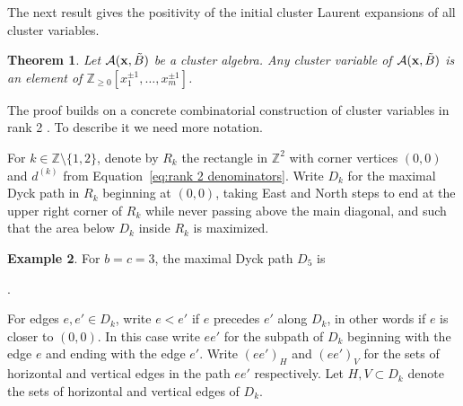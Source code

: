 \documentclass{amsart}
\newtheorem{theorem}{Theorem}[section]
\theoremstyle{definition}
\newtheorem{example}[theorem]{Example}
\theoremstyle{remark}
\numberwithin{equation}{section}
\newcommand{\cA}{{\mathcal{A}}}
\newcommand{\bx}{{\bf x}}
\newcommand{\ZZ}{{\mathbb{Z}}}
\begin{document}
  The next result gives the positivity of the initial cluster Laurent expansions of all cluster variables.
  \begin{theorem}\cite{LS13}
    Let $\cA(\bx,\tilde B)$ be a cluster algebra.  Any cluster variable of $\cA(\bx,\tilde B)$ is an element of $\ZZ_{\ge0}[x_1^{\pm1},\ldots,x_m^{\pm1}]$.
  \end{theorem}
  The proof builds on a concrete combinatorial construction of cluster variables in rank 2 \cite{LS11,LLZ12}.  To describe it we need more notation.

  For $k\in\ZZ\setminus\{1,2\}$, denote by $R_k$ the rectangle in $\ZZ^2$ with corner vertices $(0,0)$ and $d^{(k)}$ from Equation~\ref{eq:rank 2 denominators}.  Write $D_k$ for the maximal Dyck path in $R_k$ beginning at $(0,0)$, taking East and North steps to end at the upper right corner of $R_k$ while never passing above the main diagonal, and such that the area below $D_k$ inside $R_k$ is maximized.
  \begin{example}
    For $b=c=3$, the maximal Dyck path $D_5$ is
    \begin{center}
    .
    \end{center}
  \end{example}
  For edges $e,e'\in D_k$, write $e<e'$ if $e$ precedes $e'$ along $D_k$, in other words if $e$ is closer to $(0,0)$.  In this case write $ee'$ for the subpath of $D_k$ beginning with the edge $e$ and ending with the edge $e'$.  Write $(ee')_H$ and $(ee')_V$ for the sets of horizontal and vertical edges in the path $ee'$ respectively.  Let $H,V\subset D_k$ denote the sets of horizontal and vertical edges of $D_k$.
\end{document}
